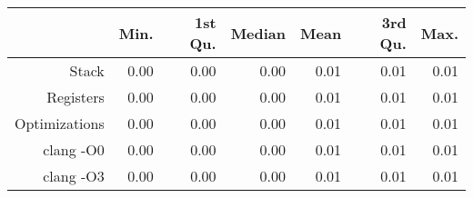 \begin{table}[ht]
\centering
\begin{tabular}{rrrrrrr}
  \hline
 & Min. & 1st Qu. & Median & Mean & 3rd Qu. & Max. \\ 
  \hline
Stack & 0.00 & 0.00 & 0.00 & 0.01 & 0.01 & 0.01 \\ 
  Registers & 0.00 & 0.00 & 0.00 & 0.01 & 0.01 & 0.01 \\ 
  Optimizations & 0.00 & 0.00 & 0.00 & 0.01 & 0.01 & 0.01 \\ 
  clang -O0 & 0.00 & 0.00 & 0.00 & 0.01 & 0.01 & 0.01 \\ 
  clang -O3 & 0.00 & 0.00 & 0.00 & 0.01 & 0.01 & 0.01 \\ 
   \hline
\end{tabular}
\end{table}
